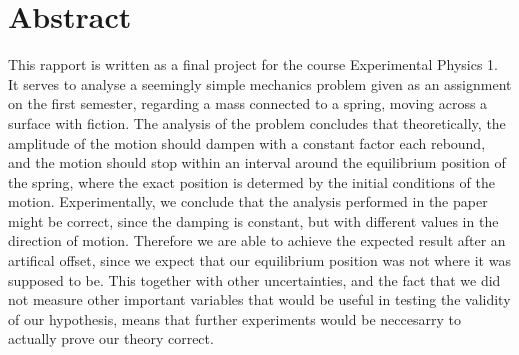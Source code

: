 \maketitle
%
\clearpage
\chapter{Abstract}
This rapport is written as a final project for the course Experimental Physics 1. 
It serves to analyse a seemingly simple mechanics problem given as an assignment on the first semester, regarding a mass connected to a spring, moving across a surface with fiction.
The analysis of the problem concludes that theoretically, the amplitude of the motion should dampen with a constant factor each rebound, and the motion should stop within an interval around the equilibrium position of the spring, 
where the exact position is determed by the initial conditions of the motion.
Experimentally, we conclude that the analysis performed in the paper might be correct, since the damping is constant, but with different values in the direction of motion.
Therefore we are able to achieve the expected result after an artifical offset, since we expect that our equilibrium position was not where it was supposed to be. 
This together with other uncertainties, and the fact that we did not measure other important variables that would be useful in testing the validity of our hypothesis, 
means that further experiments would be neccesarry to actually prove our theory correct.